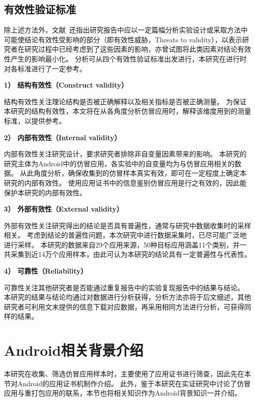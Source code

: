 \subsection{有效性验证标准}
除上述方法外，文献~\cite{easterbrook2008selecting}还指出研究报告中应以一定篇幅分析实验设计或采取方法中可能使结论有效性受影响的部分（即有效性威胁，Threats to validity），以表示研究者在研究过程中已经考虑到了这些因素的影响，亦曾试图将此类因素对结论有效性产生的影响最小化。
分析可从四个有效性验证标准出发进行，本研究在进行时对各标准进行了一定参考。

\textbf{1） 结构有效性（Construct validity）}

结构有效性关注理论结构是否被正确解释以及相关指标是否被正确测量。
为保证本研究的结构有效性，本文将在从各角度分析仿冒应用时，解释该维度用到的测量标准，以提供参考。

\textbf{2） 内部有效性（Internal validity）}

内部有效性关注研究设计，要求研究者排除非自变量因素带来的影响。
本研究的研究主体为Android中的仿冒应用，各实验中的自变量均为与仿冒应用相关的数据。
从此角度分析，确保收集到的仿冒样本真实有效，即可在一定程度上确定本研究的内部有效性。
使用应用证书中的信息鉴别仿冒应用是行之有效的，因此能保护本研究的内部有效性。

\textbf{3） 外部有效性（External validity）}

外部有效性关注研究得出的结论是否具有普遍性，通常与研究中数据收集时的采样相关。
考虑到结论的普遍性问题，本次研究中进行数据采集时，已尽可能广泛地进行采样。
本研究的数据来自29个应用来源，50种目标应用涵盖11个类别，并一共采集到近14万个应用样本，由此可认为本研究的结论具有一定普遍性与代表性。

\textbf{4） 可靠性（Reliability）}

可靠性关注其他研究者是否能通过重复报告中的实验复现报告中的结果与结论。
本研究的结果与结论均通过对数据进行分析获得，分析方法亦将于后文细述，其他研究者可利用文末提供的信息下载对应数据，再采用相同方法进行分析，可获得同样的结果。

\section{Android相关背景介绍}

本研究在收集、筛选仿冒应用样本时，主要使用了应用证书进行筛查，因此先在本节对Android的应用证书机制作介绍。
此外，鉴于本研究在实证研究中讨论了仿冒应用与重打包应用的联系，本节也将相关知识作为Android背景知识一并介绍。

